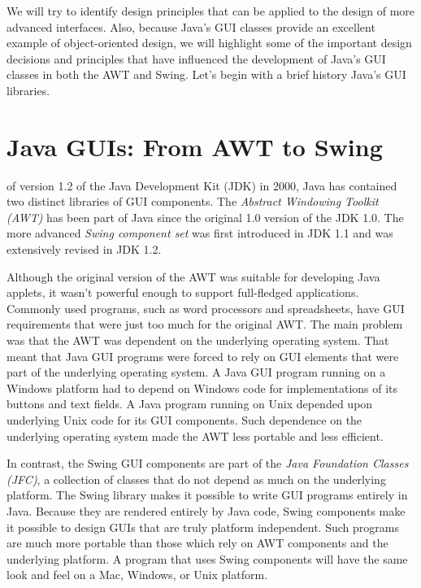 We will try to identify design principles that can be applied to the
design of more advanced interfaces.  Also, because Java's GUI classes
provide an excellent example of object-oriented design, we will
highlight some of the important design decisions and principles that
have influenced the development of Java's GUI classes in both the AWT
and Swing.  Let's begin with a brief history Java's GUI libraries.

\section{Java GUIs: From AWT to Swing}
\WWWjava
 of version 1.2 of the Java
Development Kit (JDK) in 2000, Java has contained two distinct
libraries of GUI components.  The {\it Abstract Windowing Toolkit
(AWT)} has been part of Java since the original 1.0 version of the JDK
1.0.  The more advanced {\em Swing component set} was first introduced
in JDK 1.1 and was extensively revised in JDK 1.2.

Although the original version of the AWT was suitable for developing
Java applets, it wasn't powerful enough to support full-fledged
applications. Commonly used programs, such as word processors and
spreadsheets, have GUI requirements that were just too much for the
original AWT.  The main problem was that the AWT was dependent on the
underlying operating system. That meant that Java GUI programs were
forced to rely on GUI elements that were part of the underlying
operating system. A Java GUI program running on a Windows platform had
to depend on Windows code for implementations of its buttons and text
fields.  A Java program running on Unix depended upon underlying Unix
code for its GUI components. Such dependence on the underlying
operating system made the AWT less portable and less efficient.

In contrast, the Swing GUI components are part of the {\it Java
Foundation Classes (JFC)}, a collection of classes that do not depend
as much on the underlying platform. The Swing library makes it
possible to write GUI programs entirely in Java. Because they are
rendered entirely by Java code, Swing components make it possible to
design GUIs that are truly platform independent.  Such programs are
much more portable than those which rely on AWT components and the
underlying platform.  A program that uses Swing components will have
the same look and feel on a Mac, Windows, or Unix platform.

